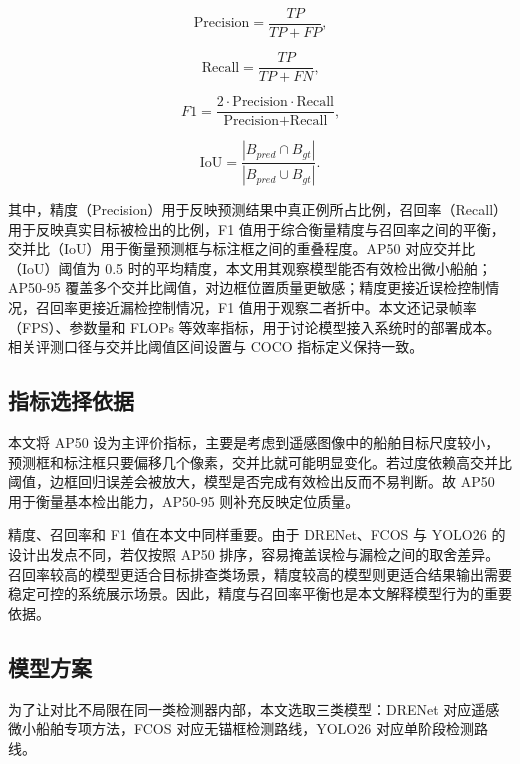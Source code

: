 \begin{equation}
\text{Precision} = \frac{TP}{TP + FP}\text{,}
\end{equation}

\begin{equation}
\text{Recall} = \frac{TP}{TP + FN}\text{,}
\end{equation}

\begin{equation}
F1 = \frac{2 \cdot \text{Precision} \cdot \text{Recall}}{\text{Precision} + \text{Recall}}\text{,}
\end{equation}

\begin{equation}
\text{IoU} = \frac{|B_{pred} \cap B_{gt}|}{|B_{pred} \cup B_{gt}|}\text{.}
\end{equation}

其中，精度（Precision）用于反映预测结果中真正例所占比例，召回率（Recall）用于反映真实目标被检出的比例，F1 值用于综合衡量精度与召回率之间的平衡，交并比（IoU）用于衡量预测框与标注框之间的重叠程度。AP50 对应交并比（IoU）阈值为 0.5 时的平均精度，本文用其观察模型能否有效检出微小船舶；AP50-95 覆盖多个交并比阈值，对边框位置质量更敏感；精度更接近误检控制情况，召回率更接近漏检控制情况，F1 值用于观察二者折中。本文还记录帧率（FPS）、参数量和 FLOPs 等效率指标，用于讨论模型接入系统时的部署成本。相关评测口径与交并比阈值区间设置与 COCO 指标定义保持一致\cite{lin2014_coco}。

\subsection{指标选择依据}

本文将 AP50 设为主评价指标，主要是考虑到遥感图像中的船舶目标尺度较小，预测框和标注框只要偏移几个像素，交并比就可能明显变化。若过度依赖高交并比阈值，边框回归误差会被放大，模型是否完成有效检出反而不易判断。故 AP50 用于衡量基本检出能力，AP50-95 则补充反映定位质量。

精度、召回率和 F1 值在本文中同样重要。由于 DRENet、FCOS 与 YOLO26 的设计出发点不同，若仅按照 AP50 排序，容易掩盖误检与漏检之间的取舍差异。召回率较高的模型更适合目标排查类场景，精度较高的模型则更适合结果输出需要稳定可控的系统展示场景。因此，精度与召回率平衡也是本文解释模型行为的重要依据。

\subsection{模型方案}

为了让对比不局限在同一类检测器内部，本文选取三类模型：DRENet 对应遥感微小船舶专项方法，FCOS 对应无锚框检测路线，YOLO26 对应单阶段检测路线。

